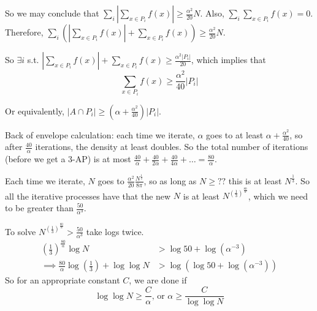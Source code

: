 \documentclass[a4paper]{article}
\newcommand*\abs[1]{\left|#1\right|}
\begin{document}
So we may conclude that $\sum_i \abs{\sum_{x \in P_i} f(x)} \geq \frac{\alpha^2}{20}N$. Also, $\sum_i \sum_{x \in P_i} f(x) = 0$. Therefore, $\sum_i\left(\abs{\sum_{x \in P_i}f(x)} + \sum_{x \in P_i}f(x)\right) \geq \frac{\alpha^2}{20}N$.

So $\exists i$ s.t. $\abs{\sum_{x \in P_i} f(x)} + \sum_{x \in P_i} f(x) \geq \frac{\alpha^2 \abs{P_i}}{20}$, which implies that $$\sum_{x\in P_i} f(x) \geq \frac{\alpha^2}{40}\abs{P_i}$$

Or equivalently, $\abs{A \cap P_i} \geq \left(\alpha + \frac{\alpha^2}{40} \right) \abs{P_i}$.

Back of envelope calculation: each time we iterate, $\alpha$ goes to at least $\alpha + \frac{\alpha^2}{40}$, so after $\frac{40}{\alpha}$ iterations, the density at least doubles. So the total number of iterations (before we get a 3-AP) is at most $\frac{40}{\alpha} + \frac{40}{2\alpha} + \frac{40}{4\alpha} + \dots = \frac{80}{\alpha}$.

Each time we iterate, $N$ goes to $\frac{\alpha^2}{20}\frac{N^{\frac{1}{2}}}{8\pi}$, so as long as $N \geq ??$ this is at least $N^{\frac{1}{3}}$. So all the iterative processes have that the new $N$ is at least $N^{(\frac{1}{3})^{\frac{80}{\alpha}}}$, which we need to be greater than $\frac{50}{\alpha^3}$.

To solve $N^{(\frac{1}{3})^{\frac{80}{\alpha}}} > \frac{50}{\alpha^3}$ take logs twice.
\begin{align*}
	\left(\frac{1}{3}\right)^{\frac{80}{\alpha}} \log N &> \log 50 + \log(\alpha^{-3}) \\
	\implies \frac{80}{\alpha}\log(\frac{1}{3}) + \log\log N &> \log(\log 50 + \log(\alpha^{-3}))
\end{align*}
So for an appropriate constant $C$, we are done if $$\log\log N \geq \frac{C}{\alpha} \text{, or } \alpha \geq \frac{C}{\log\log N}$$
\end{document}

